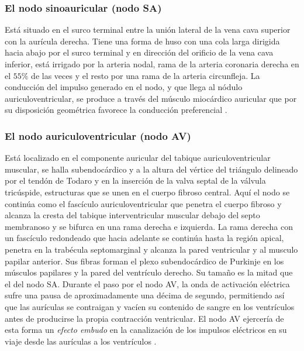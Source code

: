 \documentclass[12pt,letterpaper,oneside,openright]{book}
\begin{document}
	\subsubsection*{El nodo sinoauricular (nodo SA)} 
	Está situado en el surco terminal entre la unión lateral de la vena cava superior con la aurícula derecha. Tiene una forma de huso con una cola larga dirigida hacia abajo por el surco terminal y en dirección del orificio de la vena cava inferior, está irrigado por la arteria nodal, rama de la arteria coronaria derecha en el $55\%$ de las veces y el resto por una rama de la arteria circunfleja. La conducción del impulso generado en el nodo, y que llega al nódulo auriculoventricular, se produce a través del músculo miocárdico auricular que por su disposición geométrica favorece la conducción preferencial \cite{fbbva}. 
	\subsubsection*{El nodo auriculoventricular (nodo AV)}
	Está localizado en el componente auricular del tabique auriculoventricular muscular, se halla subendocárdico y a la altura del vértice del triángulo delineado por el tendón de Todaro y en la inserción de la valva septal de la válvula tricúspide, estructuras que se unen en el cuerpo fibroso central. Aquí el nodo se continúa como el fascículo auriculoventricular que penetra el cuerpo fibroso y alcanza la cresta del tabique interventricular muscular debajo del septo membranoso y se bifurca en una rama derecha e izquierda. La rama derecha con un fascículo redondeado que hacia adelante se continúa hasta la región apical, penetra en la trabécula septomarginal y alcanza la pared ventricular y al musculo papilar anterior. Sus fibras forman el plexo subendocárdico de Purkinje en los músculos papilares y la pared del ventrículo derecho. Su tamaño es la mitad que el del nodo SA. Durante el paso por el nodo AV, la onda de activación eléctrica sufre una pausa de aproximadamente una décima de segundo, permitiendo así que las aurículas se contraigan y vacíen su contenido de sangre en los ventrículos antes de producirse la propia contracción ventricular. El nodo AV ejercería de esta forma un \textit{efecto embudo} en la canalización de los impulsos eléctricos en su viaje desde las aurículas a los ventrículos \cite{fbbva}.
\end{document}
